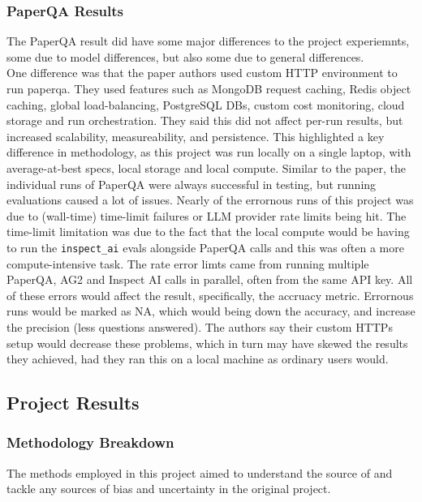 \subsubsection{PaperQA Results}
The PaperQA result did have some major differences to the project experiemnts, some due to model differences, but also some due to general differences. \\

One difference was that the paper authors used custom HTTP environment to run paperqa. They used features such as MongoDB request caching, Redis object caching, global load-balancing, PostgreSQL DBs, custom cost monitoring, cloud storage and run orchestration. They said this did not affect per-run results, but increased scalability, measureability, and persistence. This highlighted a key difference in methodology, as this project was run locally on a single laptop, with average-at-best specs, local storage and local compute. Similar to the paper, the individual runs of PaperQA were always successful in testing, but running evaluations caused a lot of issues. Nearly of the errornous runs of this project was due to (wall-time) time-limit failures or LLM provider rate limits being hit. The time-limit limitation was due to the fact that the local compute would be having to run the \texttt{inspect\_ai} evals alongside PaperQA calls and this was often a more compute-intensive task. The rate error limts came from running multiple PaperQA, AG2 and Inspect AI calls in parallel, often from the same API key. All of these errors would affect the result, specifically, the accruacy metric. Errornous runs would be marked as NA, which would being down the accuracy, and increase the precision (less questions answered). The authors say their custom HTTPs setup would decrease these problems, which in turn may have skewed the results they achieved, had they ran this on a local machine as ordinary users would. 


\subsection{Project Results}

\subsubsection{Methodology Breakdown}
The methods employed in this project aimed to understand the source of and tackle any sources of bias and uncertainty in the original project. 

